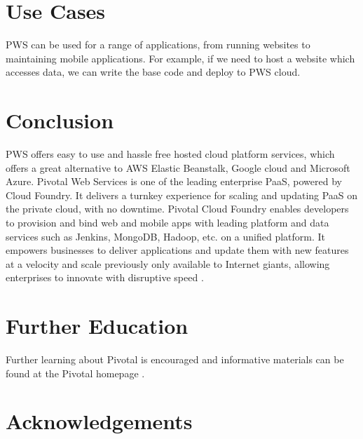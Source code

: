\documentclass[9pt,twocolumn,twoside]{../../styles/osajnl}
\begin{document}
\section{Use Cases}
PWS can be used for a range of applications, from running websites to maintaining mobile applications. For example, if we need to host a website which accesses data, we can write the base code and deploy to PWS cloud.


\section{Conclusion}
PWS offers easy to use and hassle free  hosted cloud platform services, which offers a great alternative to AWS Elastic Beanstalk, Google cloud and Microsoft Azure. 
Pivotal Web Services is one of the leading enterprise PaaS, powered by Cloud Foundry.  It delivers a turnkey experience for scaling and updating PaaS on the private cloud, with no downtime. Pivotal Cloud Foundry enables developers to provision and bind web and mobile apps with leading  platform and data services such as Jenkins, MongoDB, Hadoop, etc. on a unified platform. It empowers  businesses to deliver applications and update them with new features at a velocity and scale previously only available to Internet giants, allowing enterprises to innovate with disruptive speed \cite{www-pws-adv}.


\section{Further Education}
Further learning about Pivotal is encouraged and informative materials can be found at the Pivotal homepage \cite{www-pws-agile}.

\section*{Acknowledgements}
\end{document}
